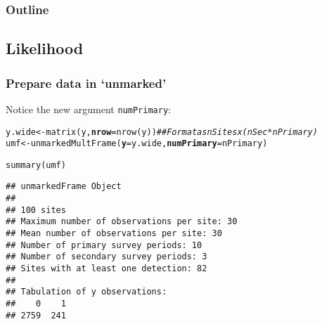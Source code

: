 \documentclass[color=usenames,dvipsnames]{beamer}\usepackage[]{graphicx}\usepackage[]{color}
\makeatletter
\newcommand{\hlcom}[1]{\textcolor[rgb]{0.514,0.506,0.514}{\textit{#1}}}%
\newcommand{\hlstd}[1]{\textcolor[rgb]{0,0,0}{#1}}%
\newcommand{\hlkwb}[1]{\textcolor[rgb]{0,0.341,0.682}{#1}}%
\newcommand{\hlkwc}[1]{\textcolor[rgb]{0,0,0}{\textbf{#1}}}%
\newcommand{\hlkwd}[1]{\textcolor[rgb]{0.004,0.004,0.506}{#1}}%
\newenvironment{kframe}{%
 \def\at@end@of@kframe{}%
 \ifinner\ifhmode%
  \def\at@end@of@kframe{\end{minipage}}%
  \begin{minipage}{\columnwidth}%
 \fi\fi%
 \def\FrameCommand##1{\hskip\@totalleftmargin \hskip-\fboxsep
 \colorbox{shadecolor}{##1}\hskip-\fboxsep
     \hskip-\linewidth \hskip-\@totalleftmargin \hskip\columnwidth}%
 \MakeFramed {\advance\hsize-\width
   \@totalleftmargin\z@ \linewidth\hsize
   \@setminipage}}%
 {\par\unskip\endMakeFramed%
 \at@end@of@kframe}
\newenvironment{knitrout}{}{} %
\newcommand{\inr}[1]{\colorbox{inlinecolor}{\texttt{#1}}}
\makeatother
\begin{document}
\begin{frame}[fragile]
\begin{columns}
\begin{column}{0.6\textwidth}
  \end{column}
  \end{columns}
\end{frame}



\begin{frame}
  \frametitle{Outline}
  \Large
  \tableofcontents[currentsection]
\end{frame}



\subsection{Likelihood}



\begin{frame}[fragile]
  \frametitle{Prepare data in `unmarked'}
  \small
Notice the new argument \inr{numPrimary}:
\begin{knitrout}\scriptsize
{}\color{fgcolor}\begin{kframe}
\begin{alltt}
\hlstd{y.wide} \hlkwb{<-} \hlkwd{matrix}\hlstd{(y,} \hlkwc{nrow}\hlstd{=}\hlkwd{nrow}\hlstd{(y))} \hlcom{## Format as nSites x (nSec*nPrimary)}
\hlstd{umf} \hlkwb{<-} \hlkwd{unmarkedMultFrame}\hlstd{(}\hlkwc{y}\hlstd{=y.wide,} \hlkwc{numPrimary}\hlstd{=nPrimary)}
\end{alltt}
\end{kframe}
\end{knitrout}
\pause

\begin{knitrout}\scriptsize
{}\color{fgcolor}\begin{kframe}
\begin{alltt}
\hlkwd{summary}\hlstd{(umf)}
\end{alltt}
\begin{verbatim}
## unmarkedFrame Object
## 
## 100 sites
## Maximum number of observations per site: 30 
## Mean number of observations per site: 30 
## Number of primary survey periods: 10 
## Number of secondary survey periods: 3 
## Sites with at least one detection: 82 
## 
## Tabulation of y observations:
##    0    1 
## 2759  241
\end{verbatim}
\end{kframe}
\end{knitrout}
\end{frame}
\end{document}
